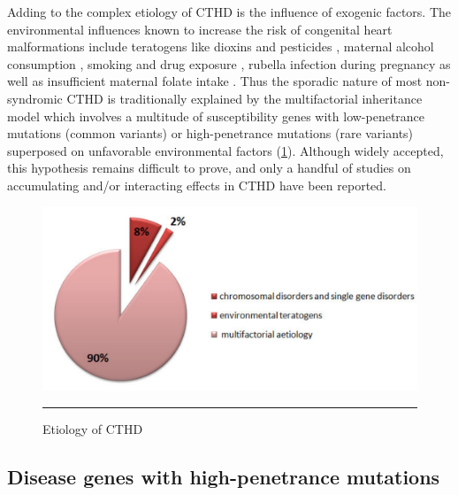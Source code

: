 \begin{refsection}
Adding to the complex etiology of CTHD is the influence of exogenic factors. The environmental influences known to increase the risk of congenital heart malformations include teratogens like dioxins and pesticides \cite{kopf2009overview}, maternal alcohol consumption \cite{burd2007congenital}, smoking \cite{alverson2011maternal} and drug exposure \cite{cassina2013pregnancy,jentink2010valproic}, rubella infection during pregnancy \cite{dewan2012burden} as well as insufficient maternal folate intake \cite{ionescu2009prevalence,van2010protective}. 
Thus the sporadic nature of most non-syndromic CTHD is traditionally explained by the multifactorial inheritance model which involves a multitude of susceptibility genes with low-penetrance mutations (common variants) or high-penetrance mutations (rare variants) superposed on unfavorable environmental factors (\cref{fig:1_4}). Although widely accepted, this hypothesis remains difficult to prove, and only a handful of studies on accumulating and/or interacting effects in CTHD have been reported.

\begin{figure}[!tb]
\centering
\includegraphics[scale=0.5,keepaspectratio]{Figures/Figure1_4.pdf}
\rule{35em}{0.5pt}
\caption[Etiology of CTHD]{Etiology of CTHD \cite{nora1968multifactorial}}
\label{fig:1_4}
\end{figure}

\subsection{Disease genes with high-penetrance mutations}


\end{refsection}
